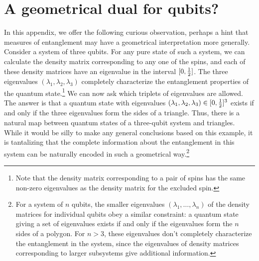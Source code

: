 \documentclass[12pt,epsf]{article}
\renewcommand{\(}{\left(}
\renewcommand{\)}{\right)}
\begin{document}
\section{A geometrical dual for qubits?}

In this appendix, we offer the following curious observation, perhaps a hint that measures of entanglement may have a geometrical interpretation more generally. Consider a system of three qubits. For any pure state of such a system, we can calculate the density matrix corresponding to any one of the spins, and each of these density matrices have an eigenvalue in the interval $[0,{1 \over 2}]$. The three eigenvalues $(\lambda_1, \lambda_2, \lambda_3)$ completely characterize the entanglement properties of the quantum state.\footnote{Note that the density matrix corresponding to a pair of spins has the same non-zero eigenvalues as the density matrix for the excluded spin.} We can now ask which triplets of eigenvalues are allowed. The answer \cite{hss} is that a quantum state with eigenvalues $(\lambda_1, \lambda_2, \lambda_3) \in [0,{1 \over 2}]^3$ exists if and only if the three eigenvalues form the sides of a triangle. Thus, there is a natural map between quantum states of a three-qubit system and triangles. While it would be silly to make any general conclusions based on this example, it is tantalizing that the complete information about the entanglement in this system can be naturally encoded in such a geometrical way.\footnote{For a system of $n$ qubits, the smaller eigenvalues $(\lambda_1, \dots, \lambda_n)$ of the density matrices for individual qubits obey a similar constraint: a quantum state giving a set of eigenvalues exists if and only if the eigenvalues form the $n$ sides of a polygon. For $n>3$, these eigenvalues don't completely characterize the entanglement in the system, since the eigenvalues of density matrices corresponding to larger subsystems give additional information.}
\end{document}
